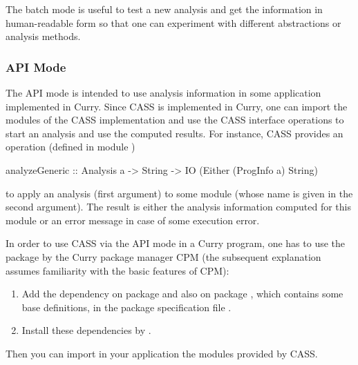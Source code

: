 The batch mode is useful to test a new analysis and get the information
in human-readable form so that one can experiment
with different abstractions or analysis methods.

\subsubsection{API Mode}

The API mode is intended to use analysis information in some
application implemented in Curry. Since CASS is implemented in Curry,
one can import the modules of the CASS implementation and
use the CASS interface operations to start an analysis and use the
computed results. For instance, CASS provides an operation
(defined in module )
\begin{curry}
analyzeGeneric :: Analysis a -> String -> IO (Either (ProgInfo a) String)
\end{curry}
to apply an analysis (first argument) to some module (whose name is
given in the second argument). The result is either the analysis
information computed for this module or an error message in case of
some execution error.

In order to use CASS via the API mode in a Curry program,
one has to use the package  by the Curry package manager CPM
(the subsequent explanation assumes familiarity with the basic
features of CPM):
\begin{enumerate}
\item
Add the dependency on package  and also on
package , which contains some base definitions,
in the package specification file .
\item
Install these dependencies by .
\end{enumerate}
Then you can import in your application the modules
provided by CASS.

